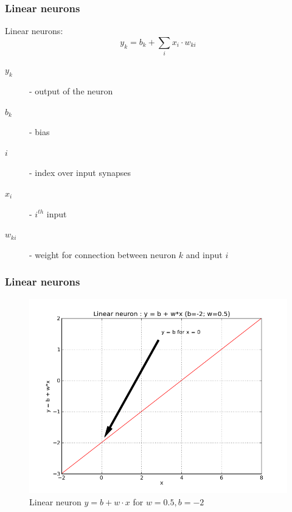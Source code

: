 \begin{frame}
  \frametitle{Linear neurons}
  \begin{definition}
    \alert{Linear neurons}:
    \begin{equation}
      \label{eq:linear-neuron}
      y_k = b_k + \displaystyle\sum_{i}x_i\cdot w_{ki}
    \end{equation}
    \begin{description}
    \item[$y_k$] - output of the neuron
    \item[$b_k$] - bias
    \item[$i$] - index over input synapses
    \item[$x_i$] - $i^{th}$ input
    \item[$w_{ki}$] - weight for connection between neuron $k$ and input $i$
    \end{description}
  \end{definition}
\end{frame}

\begin{frame}
  \frametitle{Linear neurons}
  \begin{figure}[h!]
    \centering
    \includegraphics[width=.7\textwidth]{graphics/linear_neuron.png}
    \caption{Linear neuron $y = b + w \cdot x$ for $w = 0.5,b=-2$}
    \label{fig:linearneuron}
  \end{figure}
\end{frame}

